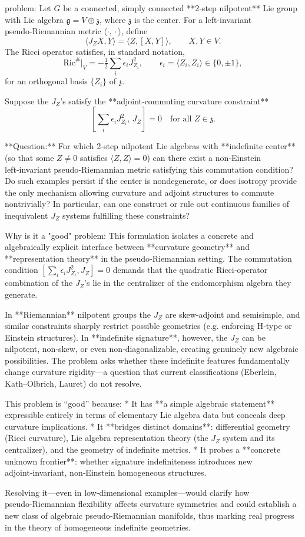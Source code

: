 problem:  
Let \( G \) be a connected, simply connected **2‑step nilpotent** Lie group with Lie algebra \( \mathfrak{g} = V \oplus \mathfrak{z} \), where \( \mathfrak{z} \) is the center.  
For a left‑invariant pseudo‑Riemannian metric \( \langle \!\cdot,\!\cdot \!\rangle \), define  
\[
\langle J_Z X, Y\rangle=\langle Z,[X,Y]\rangle ,\qquad X,Y\in V.
\]
The Ricci operator satisfies, in standard notation,
\[
\mathrm{Ric}^{\#}|_V=-\tfrac12\sum_i \epsilon_i J_{Z_i}^{2},\qquad \epsilon_i=\langle Z_i,Z_i\rangle\in\{0,\pm1\},
\]
for an orthogonal basis \( \{Z_i\} \) of \(\mathfrak{z}\).  

Suppose the \(J_Z\)’s satisfy the **adjoint‑commuting curvature constraint**
\[
[\sum_i \epsilon_i J_{Z_i}^2,\,J_Z]=0 \quad\text{for all } Z\in\mathfrak{z}.
\]

**Question:**  
For which 2‑step nilpotent Lie algebras with **indefinite center** (so that some \(Z\neq 0\) satisfies \(\langle Z,Z\rangle=0\)) can there exist a non‑Einstein left‑invariant pseudo‑Riemannian metric satisfying this commutation condition?  
Do such examples persist if the center is nondegenerate, or does isotropy provide the only mechanism allowing curvature and adjoint structures to commute nontrivially?  
In particular, can one construct or rule out continuous families of inequivalent \(J_Z\) systems fulfilling these constraints?

Why is it a "good" problem:  
This formulation isolates a concrete and algebraically explicit interface between **curvature geometry** and **representation theory** in the pseudo‑Riemannian setting.  The commutation condition  
\([ \sum_i \epsilon_i J_{Z_i}^2, J_Z ] = 0\)  
demands that the quadratic Ricci‑operator combination of the \(J_Z\)’s lie in the centralizer of the endomorphism algebra they generate.  

In **Riemannian** nilpotent groups the \(J_Z\) are skew‑adjoint and semisimple, and similar constraints sharply restrict possible geometries (e.g. enforcing H‑type or Einstein structures).  In **indefinite signature**, however, the \(J_Z\) can be nilpotent, non‑skew, or even non‑diagonalizable, creating genuinely new algebraic possibilities.  The problem asks whether these indefinite features fundamentally change curvature rigidity—a question that current classifications (Eberlein, Kath–Olbrich, Lauret) do not resolve.

This problem is “good” because:
* It has **a simple algebraic statement** expressible entirely in terms of elementary Lie algebra data but conceals deep curvature implications.  
* It **bridges distinct domains**: differential geometry (Ricci curvature), Lie algebra representation theory (the \(J_Z\) system and its centralizer), and the geometry of indefinite metrics.  
* It probes a **concrete unknown frontier**: whether signature indefiniteness introduces new adjoint‑invariant, non‑Einstein homogeneous structures.  

Resolving it—even in low‑dimensional examples—would clarify how pseudo‑Riemannian flexibility affects curvature symmetries and could establish a new class of algebraic pseudo‑Riemannian manifolds, thus marking real progress in the theory of homogeneous indefinite geometries.